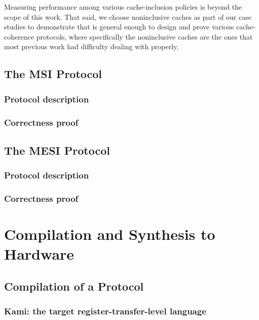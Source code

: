 Measuring performance among various cache-inclusion policies is beyond the scope of this work.
That said, we choose noninclusive caches as part of our case studies to demonstrate that \hemiola{} is general enough to design and prove various cache-coherence protocols, where specifically the noninclusive caches are the ones that most previous work had difficulty dealing with properly.

\section{The MSI Protocol}
\label{sec-msi-protocol}

\subsection{Protocol description}

\subsection{Correctness proof}
\label{sec-msi-proof}

\section{The MESI Protocol}
\label{sec-mesi-protocol}

\subsection{Protocol description}

\subsection{Correctness proof}
\label{sec-mesi-proof}

\chapter{Compilation and Synthesis to Hardware}
\label{sec-comp-syn}

\section{Compilation of a \hemiola{} Protocol}
\label{sec-compiler}

\subsection{Kami: the target register-transfer-level language}

